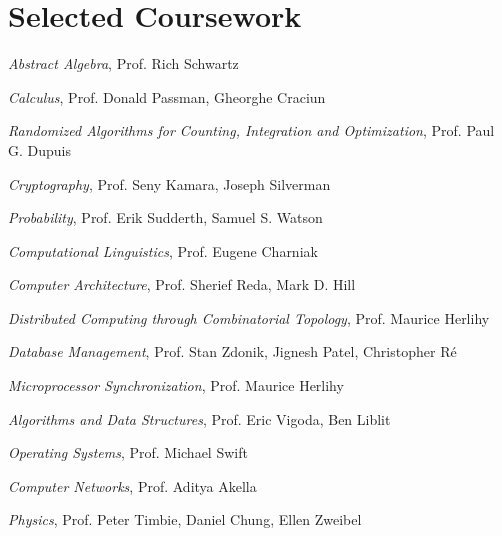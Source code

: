 \documentclass[letterpaper]{article}
\renewenvironment{itemize}{
  \begin{list}{}{
    \setlength{\leftmargin}{1.5em}
  }
}{
  \end{list}
}
\begin{document}
\section*{Selected Coursework}
\begin{itemize}
\item \textit{Abstract Algebra}, Prof. Rich Schwartz
\item \textit{Calculus}, Prof. Donald Passman, Gheorghe Craciun
\item \textit{Randomized Algorithms for Counting, Integration and Optimization}, Prof. Paul G. Dupuis
\item \textit{Cryptography}, Prof. Seny Kamara, Joseph Silverman
\item \textit{Probability}, Prof. Erik Sudderth, Samuel S. Watson 
\item \textit{Computational Linguistics}, Prof. Eugene Charniak
\item \textit{Computer Architecture}, Prof. Sherief Reda, Mark D. Hill
\item \textit{Distributed Computing through Combinatorial Topology}, Prof. Maurice Herlihy
\item \textit{Database Management}, Prof. Stan Zdonik, Jignesh Patel, Christopher R\'e
\item \textit{Microprocessor Synchronization}, Prof. Maurice Herlihy
\item \textit{Algorithms and Data Structures}, Prof. Eric Vigoda, Ben Liblit
\item \textit{Operating Systems}, Prof. Michael Swift
\item \textit{Computer Networks}, Prof. Aditya Akella
\item \textit{Physics}, Prof. Peter Timbie, Daniel Chung, Ellen Zweibel
\end{itemize}

\bigskip
\end{document}
